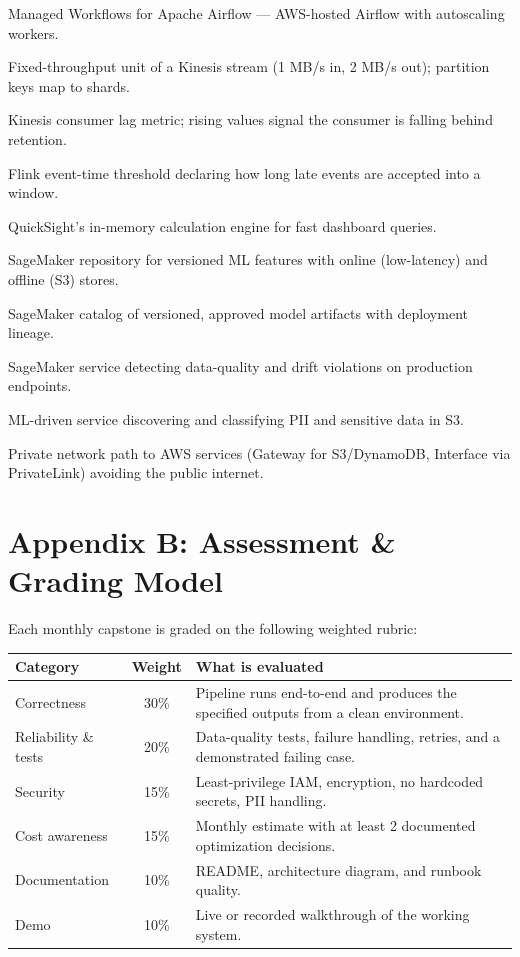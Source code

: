 \documentclass[11pt, a4paper]{article}
\begin{document}
\begin{description}[leftmargin=3.5cm, style=nextline, itemsep=1pt]
    \item[MWAA] Managed Workflows for Apache Airflow --- AWS-hosted Airflow with autoscaling workers.
    \item[Kinesis Shard] Fixed-throughput unit of a Kinesis stream (1 MB/s in, 2 MB/s out); partition keys map to shards.
    \item[Iterator Age] Kinesis consumer lag metric; rising values signal the consumer is falling behind retention.
    \item[Watermark] Flink event-time threshold declaring how long late events are accepted into a window.
    \item[SPICE] QuickSight's in-memory calculation engine for fast dashboard queries.
    \item[Feature Store] SageMaker repository for versioned ML features with online (low-latency) and offline (S3) stores.
    \item[Model Registry] SageMaker catalog of versioned, approved model artifacts with deployment lineage.
    \item[Model Monitor] SageMaker service detecting data-quality and drift violations on production endpoints.
    \item[Macie] ML-driven service discovering and classifying PII and sensitive data in S3.
    \item[VPC Endpoint] Private network path to AWS services (Gateway for S3/DynamoDB, Interface via PrivateLink) avoiding the public internet.
\end{description}

\section{Appendix B: Assessment \& Grading Model}
Each monthly capstone is graded on the following weighted rubric:

\begin{center}
\renewcommand{\arraystretch}{1.3}
\begin{tabular}{@{} l c p{7.5cm} @{}}
\toprule
\textbf{Category} & \textbf{Weight} & \textbf{What is evaluated} \\
\midrule
Correctness & 30\% & Pipeline runs end-to-end and produces the specified outputs from a clean environment. \\
Reliability \& tests & 20\% & Data-quality tests, failure handling, retries, and a demonstrated failing case. \\
Security & 15\% & Least-privilege IAM, encryption, no hardcoded secrets, PII handling. \\
Cost awareness & 15\% & Monthly estimate with at least 2 documented optimization decisions. \\
Documentation & 10\% & README, architecture diagram, and runbook quality. \\
Demo & 10\% & Live or recorded walkthrough of the working system. \\
\bottomrule
\end{tabular}
\end{center}
\end{document}
